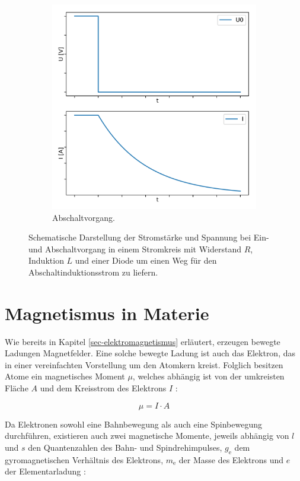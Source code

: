 \documentclass[page,pdftex,12pt,a4paper,twoside,openright]{scrbook}
\begin{document}
\begin{figure}
\begin{subfigure}[b]{0.49\textwidth}
\centering
\includegraphics[width=\textwidth]{./img/ausschalten.png}
\caption{Abschaltvorgang.}
\label{fig-abschalten}
\end{subfigure}
\caption{Schematische Darstellung der Stromstärke und Spannung bei Ein- und Abschaltvorgang in einem Stromkreis mit Widerstand $R$, Induktion $L$ und einer Diode um einen Weg für den Abschaltinduktionsstrom zu liefern.}
\end{figure}

\section{Magnetismus in Materie \label{sec-magnetismus}}
\label{sec:org0d2a8ca}
Wie bereits in Kapitel \ref{sec-elektromagnetismus} erläutert, erzeugen bewegte Ladungen Magnetfelder. Eine solche bewegte Ladung ist auch das Elektron, das in einer vereinfachten Vorstellung um den Atomkern kreist. Folglich besitzen Atome ein magnetisches Moment \(\mu\), welches abhängig ist von der umkreisten Fläche \(A\) und dem Kreisstrom des Elektrons \(I\) \cite{kassing_bergmann_2005}:

\begin{equation}
\label{eq-moment:}
\mu = I \cdot A
\end{equation}

Da Elektronen sowohl eine Bahnbewegung als auch eine Spinbewegung durchführen, existieren auch zwei magnetische Momente, jeweils abhängig von \(l\) und \(s\) den Quantenzahlen des Bahn- und Spindrehimpulses, \(g_\mathrm{e}\) dem gyromagnetischen Verhältnis des Elektrons, \(m_\mathrm{e}\) der Masse des Elektrons und \(e\) der Elementarladung \cite{kassing_bergmann_2005}:
\end{document}
